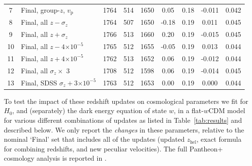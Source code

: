 \documentclass[
  journal=pasa,
  manuscript=research-paper,
  year=2022,
]{cup-journal}
\newcommand\zhel{\ensuremath{z_{\text{hel}}}}
\newcommand{\vp}{\ensuremath{v_{\text{p}}}}
\newcommand{\tten}[1]{\ensuremath{\times 10^{#1}}}
\begin{document}
\begin{table}[ht!]
\begin{tabular}{cp{4cm}cccS[table-format=-1.2]S[table-format=1.2]S[table-format=-1.3]S[table-format=1.3]}
7 & Final, group-$z$, \vp{} & 1764 & 514 & 1650 & 0.05 & 0.18 & -0.011 & 0.042\\
8 & Final, all $z-\sigma_{z}$ & 1764 & 507 & 1650 & -0.18 & 0.19 & 0.011 & 0.045\\
9 & Final, all $z+\sigma_{z}$ & 1766 & 513 & 1660 & 0.20 & 0.19 & -0.015 & 0.045\\
10 & Final, all $z-4\tten{-5}$ & 1765 & 512 & 1655 & -0.05 & 0.19 & 0.013 & 0.044\\
11 & Final, all $z+4\tten{-5}$ & 1762 & 513 & 1652 & 0.06 & 0.19 & -0.012 & 0.044\\
12 & Final, all $\sigma_{z}\times$ 3 & 1708 & 512 & 1598 & 0.06 & 0.19 & -0.014 & 0.045\\
13 & Final, SDSS $\sigma_{z} + 3\tten{-5}$ & 1763 & 512 & 1653 & 0.00 & 0.19 & 0.000 & 0.044\\
\bottomrule
\end{tabular}
\end{table}

To test the impact of these redshift updates on cosmological parameters we fit for $H_0$, and (separately) the dark energy equation of state $w$, in a flat-$w$CDM model for various different combinations of updates as listed in Table~\ref{tab:results} and described below.
We only report the {\em changes} in these parameters, relative to the nominal `Final' set that includes all of the updates (updated \zhel{}, exact formula for combining redshifts, and new peculiar velocities). 
The full Pantheon+ cosmology analysis is reported in \citet{Brout2022cosmo}.  
\end{document}
